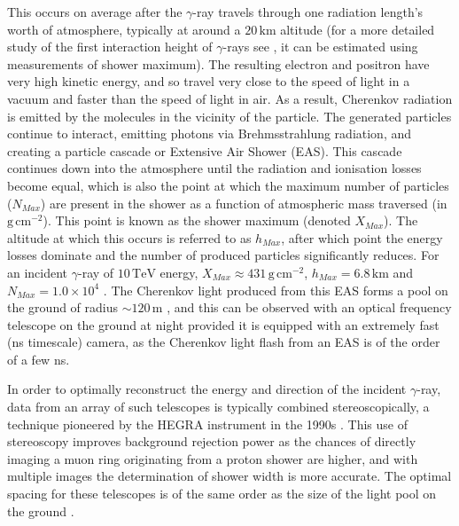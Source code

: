 This occurs on average after the $\gamma$-ray travels through one radiation length's worth of atmosphere, typically at around a $\mathrm{20\,km}$ altitude \cite{weekesgamma} (for a more detailed study of the first interaction height of $\gamma$-rays see \cite{Sitarek1i}, it can be estimated using measurements of shower maximum). The resulting electron and positron have very high kinetic energy, and so travel very close to the speed of light in a vacuum and faster than the speed of light in air. As a result, Cherenkov radiation is emitted by the molecules in the vicinity of the particle. The generated particles continue to interact, emitting photons via Brehmsstrahlung radiation, and creating a particle cascade or Extensive Air Shower (EAS). This cascade continues down into the atmosphere until the radiation and ionisation losses become equal, which is also the point at which the maximum number of particles ($N_{Max}$) are present in the shower as a function of atmospheric mass traversed (in $\mathrm{g\,cm^{-2}}$). This point is known as the shower maximum (denoted $X_{Max}$). The altitude at which this occurs is referred to as $h_{Max}$, after which point the energy losses dominate and the number of produced particles significantly reduces. For an incident $\gamma$-ray of $\mathrm{10\,TeV}$ energy, $X_{Max}\approx \mathrm{431\,g\,cm^{-2}}$, $h_{Max}=\mathrm{6.8\,km}$ and $N_{Max}=\mathrm{1.0 \times 10^4}$ \cite{weekesgamma}.  The Cherenkov light produced from this EAS forms a pool on the ground of radius $\mathrm{\sim 120\,m}$ \cite{weekesgamma}, and this can be observed with an optical frequency telescope on the ground at night provided it is equipped with an extremely fast (ns timescale) camera, as the Cherenkov light flash from an 
EAS is of the order of a few ns. 

In order to optimally reconstruct the energy and direction of the incident $\gamma$-ray, data from an array of such telescopes is typically combined stereoscopically, a technique pioneered by the HEGRA instrument in the 1990s \cite{HEGRA}. This use of stereoscopy improves background rejection power as the chances of directly imaging a muon ring originating from a proton shower are higher, and with multiple images the determination of shower width is more accurate.  The optimal spacing for these telescopes is of the same order as the size of the light pool on the ground \cite{weekesgamma}.

